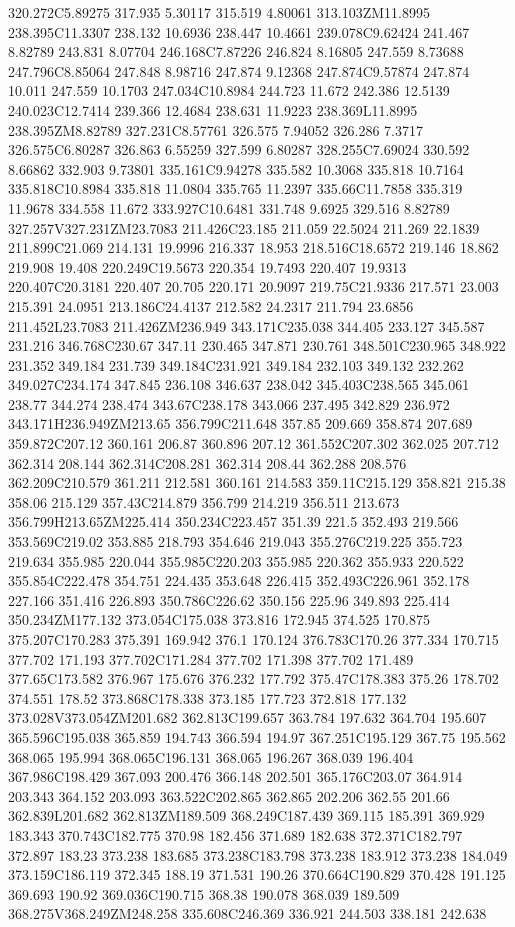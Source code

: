 320.272C5.89275 317.935 5.30117 315.519 4.80061 313.103ZM11.8995 238.395C11.3307 238.132 10.6936 238.447 10.4661 239.078C9.62424 241.467 8.82789 243.831 8.07704 246.168C7.87226 246.824 8.16805 247.559 8.73688 247.796C8.85064 247.848 8.98716 247.874 9.12368 247.874C9.57874 247.874 10.011 247.559 10.1703 247.034C10.8984 244.723 11.672 242.386 12.5139 240.023C12.7414 239.366 12.4684 238.631 11.9223 238.369L11.8995 238.395ZM8.82789 327.231C8.57761 326.575 7.94052 326.286 7.3717 326.575C6.80287 326.863 6.55259 327.599 6.80287 328.255C7.69024 330.592 8.66862 332.903 9.73801 335.161C9.94278 335.582 10.3068 335.818 10.7164 335.818C10.8984 335.818 11.0804 335.765 11.2397 335.66C11.7858 335.319 11.9678 334.558 11.672 333.927C10.6481 331.748 9.6925 329.516 8.82789 327.257V327.231ZM23.7083 211.426C23.185 211.059 22.5024 211.269 22.1839 211.899C21.069 214.131 19.9996 216.337 18.953 218.516C18.6572 219.146 18.862 219.908 19.408 220.249C19.5673 220.354 19.7493 220.407 19.9313 220.407C20.3181 220.407 20.705 220.171 20.9097 219.75C21.9336 217.571 23.003 215.391 24.0951 213.186C24.4137 212.582 24.2317 211.794 23.6856 211.452L23.7083 211.426ZM236.949 343.171C235.038 344.405 233.127 345.587 231.216 346.768C230.67 347.11 230.465 347.871 230.761 348.501C230.965 348.922 231.352 349.184 231.739 349.184C231.921 349.184 232.103 349.132 232.262 349.027C234.174 347.845 236.108 346.637 238.042 345.403C238.565 345.061 238.77 344.274 238.474 343.67C238.178 343.066 237.495 342.829 236.972 343.171H236.949ZM213.65 356.799C211.648 357.85 209.669 358.874 207.689 359.872C207.12 360.161 206.87 360.896 207.12 361.552C207.302 362.025 207.712 362.314 208.144 362.314C208.281 362.314 208.44 362.288 208.576 362.209C210.579 361.211 212.581 360.161 214.583 359.11C215.129 358.821 215.38 358.06 215.129 357.43C214.879 356.799 214.219 356.511 213.673 356.799H213.65ZM225.414 350.234C223.457 351.39 221.5 352.493 219.566 353.569C219.02 353.885 218.793 354.646 219.043 355.276C219.225 355.723 219.634 355.985 220.044 355.985C220.203 355.985 220.362 355.933 220.522 355.854C222.478 354.751 224.435 353.648 226.415 352.493C226.961 352.178 227.166 351.416 226.893 350.786C226.62 350.156 225.96 349.893 225.414 350.234ZM177.132 373.054C175.038 373.816 172.945 374.525 170.875 375.207C170.283 375.391 169.942 376.1 170.124 376.783C170.26 377.334 170.715 377.702 171.193 377.702C171.284 377.702 171.398 377.702 171.489 377.65C173.582 376.967 175.676 376.232 177.792 375.47C178.383 375.26 178.702 374.551 178.52 373.868C178.338 373.185 177.723 372.818 177.132 373.028V373.054ZM201.682 362.813C199.657 363.784 197.632 364.704 195.607 365.596C195.038 365.859 194.743 366.594 194.97 367.251C195.129 367.75 195.562 368.065 195.994 368.065C196.131 368.065 196.267 368.039 196.404 367.986C198.429 367.093 200.476 366.148 202.501 365.176C203.07 364.914 203.343 364.152 203.093 363.522C202.865 362.865 202.206 362.55 201.66 362.839L201.682 362.813ZM189.509 368.249C187.439 369.115 185.391 369.929 183.343 370.743C182.775 370.98 182.456 371.689 182.638 372.371C182.797 372.897 183.23 373.238 183.685 373.238C183.798 373.238 183.912 373.238 184.049 373.159C186.119 372.345 188.19 371.531 190.26 370.664C190.829 370.428 191.125 369.693 190.92 369.036C190.715 368.38 190.078 368.039 189.509 368.275V368.249ZM248.258 335.608C246.369 336.921 244.503 338.181 242.638 